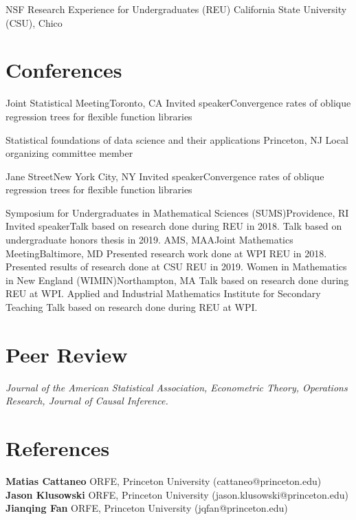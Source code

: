 \documentclass[10pt,a4paper,roman]{moderncv}        %
\begin{document}
{NSF Research Experience for Undergraduates (REU)}
{California State University (CSU), Chico}
{}
{}

\section{Conferences}
{Joint Statistical Meeting}{Toronto, CA}
{Invited speaker}{Convergence rates of oblique regression trees for flexible function libraries}

{Statistical foundations of data science and their applications}
{Princeton, NJ}
{}{Local organizing committee member}

{Jane Street}{New York City, NY}
{Invited speaker}{Convergence rates of oblique regression trees for flexible function libraries}

{Symposium for Undergraduates in Mathematical Sciences (SUMS)}{Providence, RI}
{Invited speaker}{Talk based on research done during REU in 2018.
  Talk based on undergraduate honors thesis in 2019.}
{AMS, MAA}{Joint Mathematics Meeting}{Baltimore, MD}
{}{Presented research work done at WPI REU in 2018.
  Presented results of research done at CSU REU in 2019.}
{Women in Mathematics in New England (WIMIN)}{Northampton, MA}
{}{Talk based on research done during REU at WPI.}
{Applied and Industrial Mathematics Institute for Secondary Teaching}
{Talk based on research done during REU at WPI.}

\section{Peer Review}
\textit{
Journal of the American Statistical Association, Econometric Theory, Operations
Research, Journal of Causal Inference.
}

\section{References}
\textbf{Matias Cattaneo} ORFE, Princeton University (cattaneo@princeton.edu)\\
\textbf{Jason Klusowski} ORFE, Princeton University (jason.klusowski@princeton.edu)\\
\textbf{Jianqing Fan} ORFE, Princeton University (jqfan@princeton.edu)


\clearpage
\end{document}
